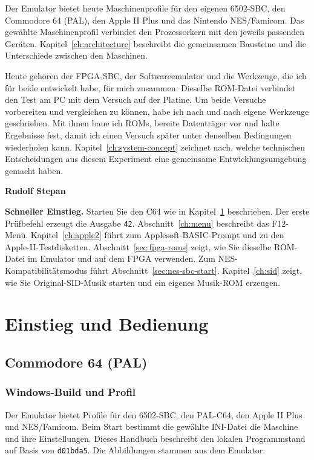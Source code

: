 \documentclass[fontsize=10.2bp,DIV=calc,oneside,open=any,headings=normal,numbers=noenddot]{scrbook}
\newcommand{\SourceRevision}{d01bda5}
\begin{document}
Der Emulator bietet heute Maschinenprofile für den eigenen 6502-SBC,
den Commodore 64 (PAL), den Apple II Plus und das Nintendo NES/Famicom.
Das gewählte Maschinenprofil verbindet den Prozessorkern mit den jeweils
passenden Geräten. Kapitel~\ref{ch:architecture} beschreibt die gemeinsamen
Bausteine und die Unterschiede zwischen den Maschinen.

Heute gehören der FPGA-SBC, der Softwareemulator und die Werkzeuge,
die ich für beide entwickelt habe, für mich zusammen. Dieselbe ROM-Datei
verbindet den Test am PC mit dem Versuch auf der Platine. Um beide
Versuche vorbereiten und vergleichen zu können, habe ich nach und nach
eigene Werkzeuge geschrieben. Mit ihnen baue ich ROMs, bereite
Datenträger vor und halte Ergebnisse fest, damit ich einen Versuch
später unter denselben Bedingungen wiederholen kann.
Kapitel~\ref{ch:system-concept} zeichnet nach, welche technischen
Entscheidungen aus diesem Experiment eine gemeinsame Entwicklungsumgebung
gemacht haben.

\medskip
\textbf{Rudolf Stepan}

\bigskip
\textbf{Schneller Einstieg.} Starten Sie den C64 wie in Kapitel~\ref{ch:start}
beschrieben. Der erste Prüfbefehl erzeugt die Ausgabe \texttt{42}. Abschnitt~\ref{ch:menu}
beschreibt das F12-Menü. Kapitel~\ref{ch:apple2} führt zum Applesoft-BASIC-Prompt
und zu den Apple-II-Testdisketten. Abschnitt~\ref{sec:fpga-roms} zeigt, wie Sie dieselbe
ROM-Datei im Emulator und auf dem FPGA verwenden. Zum NES-Kompatibilitätsmodus
führt Abschnitt~\ref{sec:nes-sbc-start}. Kapitel~\ref{ch:sid} zeigt,
wie Sie Original-SID-Musik starten und ein eigenes Musik-ROM erzeugen.

\begingroup
\linespread{1.0}\selectfont
\tableofcontents
\endgroup

\listoffigures

\mainmatter
\part{Einstieg und Bedienung}
\chapter{Commodore 64 (PAL)}\label{ch:start}

\section{Windows-Build und Profil}
Der Emulator bietet Profile für den 6502-SBC, den PAL-C64, den Apple II Plus
und NES/Famicom. Beim Start bestimmt die
gewählte INI-Datei die Maschine und ihre Einstellungen. Dieses Handbuch
beschreibt den lokalen Programmstand auf Basis von \texttt{\SourceRevision}.
Die Abbildungen stammen aus dem Emulator.
\end{document}
